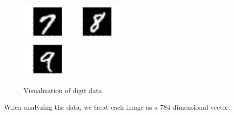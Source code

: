 \documentclass[11pt]{article}
\begin{document}
\begin{figure}[H]
\begin{center}
\includegraphics[width=1in]{7.png}
\includegraphics[width=1in]{8.png}\\
\includegraphics[width=1in]{9.png}
\caption{Visualization of digit data}
\label{digit-vis}
\end{center}
\end{figure}
When analyzing the data, we treat each image as a 784 dimensional vector.
\end{document}
